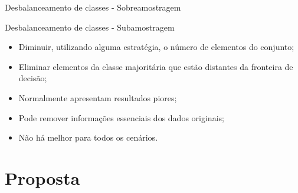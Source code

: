 \documentclass{beamer}
\begin{document}
\begin{frame}{Desbalanceamento de classes - Sobreamostragem}
\end{frame}
\begin{frame}{Desbalanceamento de classes - Subamostragem}
    \begin{itemize}
        \item Diminuir, utilizando alguma estratégia, o número de elementos do conjunto;
        \item Eliminar elementos da classe majoritária que estão distantes da fronteira de decisão;
        \item Normalmente apresentam resultados piores;
        \item Pode remover informações essenciais dos dados originais;
        \item Não há melhor para todos os cenários.
    \end{itemize}

\end{frame}
\section{Proposta}
\end{document}
